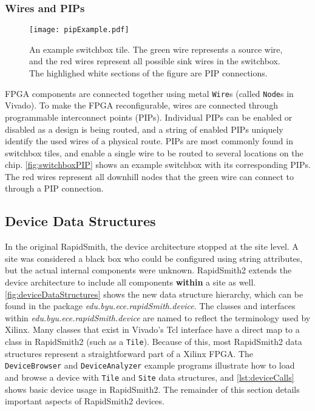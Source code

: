 \subsubsection{Wires and PIPs} \label{wireSection}
 
\begin{figure}[t!]
	\centering
	\texttt{[image: pipExample.pdf]}
	\caption{An example switchbox tile. The green wire represents a source wire,
	and the red wires represent all possible sink wires in the switchbox. The
	highlighed white sections of the figure are PIP connections.}
	\label{fig:switchboxPIP}
\end{figure} 
 
FPGA components are connected together using metal \texttt{Wire}s (called
\texttt{Node}s in Vivado). To make the FPGA reconfigurable,
wires are connected through programmable interconnect points
(PIPs). Individual PIPs can be enabled or disabled as a design is
being routed, and a string of enabled PIPs uniquely identify the
used wires of a physical route. PIPs are most commonly
found in switchbox tiles, and enable a single wire to be
routed to several locations on the chip. \autoref{fig:switchboxPIP}
shows an example switchbox with its corresponding PIPs. The red wires
represent all downhill nodes that the green wire can connect to through a PIP
connection.

\subsection{Device Data Structures} \label{devicesRS2}
In the original RapidSmith, the device architecture stopped at the
site level. A site was considered a black box who could be
configured using string attributes, but the actual internal components were
unknown. RapidSmith2 extends the device architecture to include all
components \textbf{within} a site as well. \autoref{fig:deviceDataStructures}
shows the new data structure hierarchy, which can be found in the package \emph{
edu.byu.ece.rapidSmith.device}. The classes and interfaces within
\emph{edu.byu.ece.rapid\-Smith.device} are named to reflect the terminology
used by Xilinx. Many classes that exist in Vivado's Tcl interface have a direct map
to a class in RapidSmith2 (such as a \texttt{Tile}). Because of this, most
RapidSmith2 data structures represent a straightforward part of a Xilinx FPGA.
The \texttt{DeviceBrowser} and \texttt{DeviceAnalyzer} example programs
illustrate how to load and browse a device with \texttt{Tile} and \texttt{Site}
data structures, and \autoref{lst:deviceCalls} shows basic device usage in
RapidSmith2. The remainder of this section details important aspects of
RapidSmith2 devices.

